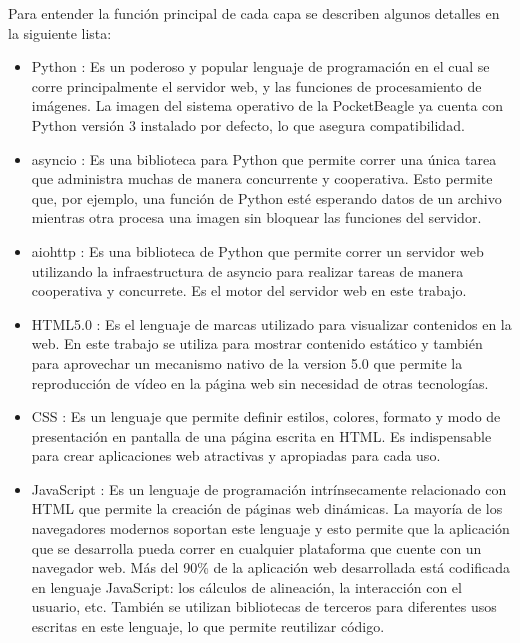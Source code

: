    Para entender la función principal de cada capa se describen algunos detalles en la siguiente lista:
   \begin{itemize}
      \item{Python \citep{WEBSITE:python}: Es un poderoso y popular lenguaje de programación en el cual se corre principalmente el servidor web, y las funciones de procesamiento de imágenes. La imagen del sistema operativo de la PocketBeagle ya cuenta con Python versión 3 instalado por defecto, lo que asegura compatibilidad.
      }
      \item{asyncio \citep{WEBSITE:asyncio}: Es una biblioteca para Python que permite correr una única tarea que administra muchas de manera concurrente y cooperativa.
      Esto permite que, por ejemplo, una función de Python esté esperando datos de un archivo mientras otra procesa una imagen sin bloquear las funciones del servidor.
      }
      \item{aiohttp \citep{WEBSITE:aiohttp}: Es una biblioteca de Python que permite correr un servidor web utilizando la infraestructura de asyncio para realizar tareas de manera cooperativa y concurrete.
      Es el motor del servidor web en este trabajo.
      }
      \item{HTML5.0 \citep{WEBSITE:html5}: Es el lenguaje de marcas utilizado para visualizar contenidos en la web.
         En este trabajo se utiliza para mostrar contenido estático y también para aprovechar un mecanismo nativo de la version 5.0 que permite la reproducción de vídeo en la página web sin necesidad de otras tecnologías.
      }
      \item{CSS \citep{WEBSITE:css}: Es un lenguaje que permite definir estilos, colores, formato y modo de presentación en pantalla de una página escrita en HTML.
      Es indispensable para crear aplicaciones web atractivas y apropiadas para cada uso.
      }
      \item{JavaScript \citep{WEBSITE:javascript}: Es un lenguaje de programación intrínsecamente relacionado con HTML que permite la creación de páginas web dinámicas.
         La mayoría de los navegadores modernos soportan este lenguaje y esto permite que la aplicación que se desarrolla pueda correr en cualquier plataforma que cuente con un navegador web.
         Más del 90\% de la aplicación web desarrollada está codificada en lenguaje JavaScript: los cálculos de alineación, la interacción con el usuario, etc.
         También se utilizan bibliotecas de terceros para diferentes usos escritas en este lenguaje, lo que permite reutilizar código.
}
\end{itemize}
